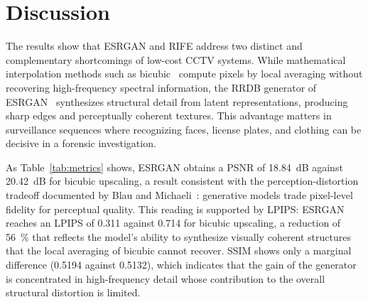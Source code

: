 \documentclass[conference]{IEEEtran}
\begin{document}
\begin{table}[t]
    \caption{Objective Quality and Computational Cost}
    \label{tab:metrics}
    \renewcommand{\arraystretch}{1.2}
    \centering
\end{table}

\section{Discussion}
\label{sec:discussion}

The results show that ESRGAN and RIFE address two distinct and complementary shortcomings of low-cost CCTV systems. While mathematical interpolation methods such as bicubic~\cite{vanouwerkerk2006survey} compute pixels by local averaging without recovering high-frequency spectral information, the RRDB generator of ESRGAN~\cite{wang2018esrgan} synthesizes structural detail from latent representations, producing sharp edges and perceptually coherent textures. This advantage matters in surveillance sequences where recognizing faces, license plates, and clothing can be decisive in a forensic investigation.

As Table~\ref{tab:metrics} shows, ESRGAN obtains a PSNR of 18.84~dB against 20.42~dB for bicubic upscaling, a result consistent with the perception-distortion tradeoff documented by Blau and Michaeli~\cite{blau2018perception}: generative models trade pixel-level fidelity for perceptual quality. This reading is supported by LPIPS: ESRGAN reaches an LPIPS of 0.311 against 0.714 for bicubic upscaling, a reduction of 56~\% that reflects the model's ability to synthesize visually coherent structures that the local averaging of bicubic cannot recover. SSIM shows only a marginal difference (0.5194 against 0.5132), which indicates that the gain of the generator is concentrated in high-frequency detail whose contribution to the overall structural distortion is limited.
\end{document}
